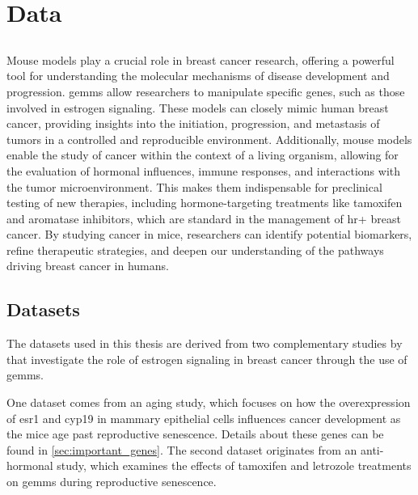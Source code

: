 \section{Data}
\label{sec:data}

\subsection{}
\label{sec:mouse_models}
Mouse models play a crucial role in breast cancer research, offering a powerful
tool for understanding the molecular mechanisms of disease development and
progression.
\Glspl{gemm} allow researchers to manipulate specific genes, such as those
involved in estrogen signaling\supercite{park_mouse_2018}.
These models can closely mimic human breast cancer, providing insights into the
initiation, progression, and metastasis of tumors in a controlled and
reproducible environment\supercite{pfefferle_transcriptomic_2013}.
Additionally, mouse models enable the study of cancer within the context of a
living organism, allowing for the evaluation of hormonal influences, immune
responses, and interactions with the tumor
microenvironment\supercite{manning_mouse_2016}.
This makes them indispensable for preclinical testing of new therapies,
including hormone-targeting treatments like tamoxifen and aromatase inhibitors,
which are standard in the management of \gls{hr+} breast
cancer\supercite{fan_endocrine_2015,yin_disruption_2014}.
By studying cancer in mice, researchers can identify potential biomarkers,
refine therapeutic strategies, and deepen our understanding of the pathways
driving breast cancer in humans\supercite{peterson_amphiregulin_2015}.

\subsection{Datasets}
\label{sec:datasets}
The datasets used in this thesis are derived from two complementary studies by
\textcite{furth_esr1_2023,furth_overexpression_2023} that investigate the role
of estrogen signaling in breast cancer through the use of \glspl{gemm}.

One dataset comes from an aging study, which focuses on how the overexpression
of \gls{esr1} and \gls{cyp19} in mammary epithelial cells influences cancer
development as the mice age past reproductive senescence.
Details about these genes can be found in \cref{sec:important_genes}.
The second dataset originates from an anti-hormonal study, which examines the
effects of tamoxifen and letrozole treatments on \glspl{gemm} during
reproductive senescence.

